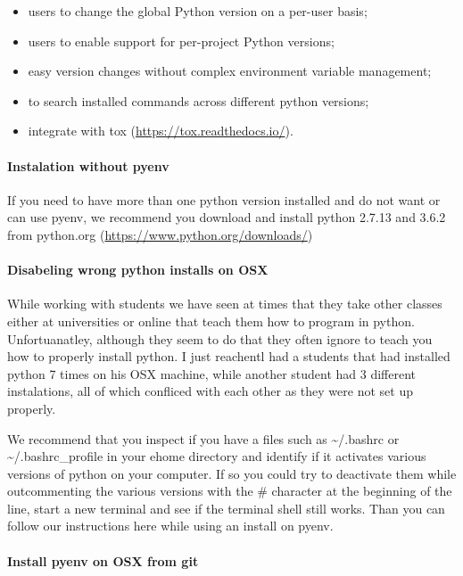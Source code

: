\begin{itemize}
\tightlist
\item
  users to change the global Python version on a per-user basis;
\item
  users to enable support for per-project Python versions;
\item
  easy version changes without complex environment variable management;
\item
  to search installed commands across different python versions;
\item
  integrate with tox (\url{https://tox.readthedocs.io/}).
\end{itemize}

\paragraph{Instalation without pyenv}\label{instalation-without-pyenv}

If you need to have more than one python version installed and do not
want or can use pyenv, we recommend you download and install python
2.7.13 and 3.6.2 from python.org
(\url{https://www.python.org/downloads/})

\paragraph{Disabeling wrong python installs on
OSX}\label{disabeling-wrong-python-installs-on-osx}

While working with students we have seen at times that they take other
classes either at universities or online that teach them how to program
in python. Unfortuanatley, although they seem to do that they often
ignore to teach you how to properly install python. I just reachentl had
a students that had installed python 7 times on his OSX machine, while
another student had 3 different instalations, all of which confliced
with each other as they were not set up properly.

We recommend that you inspect if you have a files such as
\textasciitilde{}/.bashrc or \textasciitilde{}/.bashrc\_profile in your
ehome directory and identify if it activates various versions of python
on your computer. If so you could try to deactivate them while
outcommenting the various versions with the \# character at the
beginning of the line, start a new terminal and see if the terminal
shell still works. Than you can follow our instructions here while using
an install on pyenv.

\paragraph{Install pyenv on OSX from
git}\label{install-pyenv-on-osx-from-git}

